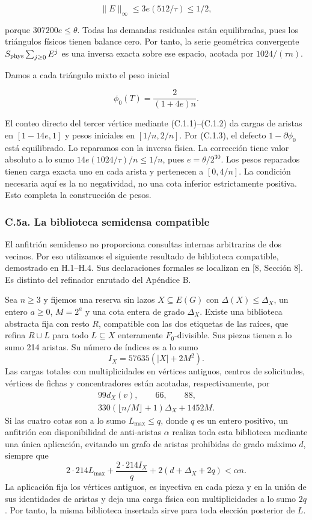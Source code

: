 \documentclass[spanish,11pt,a4paper]{article}
\begin{document}
\[\|E\|_\infty\le3e(512/\tau)\le1/2,
\tag{C.5.5}\]

porque \(307200e\le\theta\). Todas las demandas residuales están equilibradas, pues los triángulos físicos tienen balance cero. Por tanto, la serie geométrica convergente \(S_{\rm phys}\sum_{j\ge0}E^j\) es una inversa exacta sobre ese espacio, acotada por \(1024/(\tau n)\).

Damos a cada triángulo mixto el peso inicial

\[\phi_0(T)=\frac2{(1+4e)n}.
\tag{C.5.6}\]

El conteo directo del tercer vértice mediante (C.1.1)--(C.1.2) da cargas de aristas en \([1-14e,1]\) y pesos iniciales en \([1/n,2/n]\). Por (C.1.3), el defecto \(1-\partial\phi_0\) está equilibrado. Lo reparamos con la inversa física. La corrección tiene valor absoluto a lo sumo \(14e(1024/\tau)/n\le1/n\), pues \(e=\theta/2^{30}\). Los pesos reparados tienen carga exacta uno en cada arista y pertenecen a \([0,4/n]\). La condición necesaria aquí es la no negatividad, no una cota inferior estrictamente positiva. Esto completa la construcción de pesos.

\subsubsection{C.5a. La biblioteca semidensa compatible}\label{c.5a.-la-biblioteca-semidensa-compatible}

El anfitrión semidenso no proporciona consultas internas arbitrarias de dos vecinos. Por eso utilizamos el siguiente resultado de biblioteca compatible, demostrado en H.1--H.4. Sus declaraciones formales se localizan en {[}8, Sección 8{]}. Es distinto del refinador enrutado del Apéndice B.

Sea \(n\ge3\) y fijemos una reserva sin lazos \(X\subseteq E(G)\) con \(\Delta(X)\le\Delta_X\), un entero \(a\ge0\), \(M=2^a\) y una cota entera de grado \(\Delta_X\). Existe una biblioteca abstracta fija con resto \(R\), compatible con las dos etiquetas de las raíces, que refina \(R\cup L\) para todo \(L\subseteq X\) enteramente \(F_0\)-divisible. Sus piezas tienen a lo sumo 214 aristas. Su número de índices es a lo sumo \[I_X=57635(|X|+2M^2).\] Las cargas totales con multiplicidades en vértices antiguos, centros de solicitudes, vértices de fichas y concentradores están acotadas, respectivamente, por \[\begin{gathered}
99d_X(v),\qquad66,\qquad88,\\
330(\lfloor n/M\rfloor+1)\Delta_X+1452M.
\end{gathered}\] Si las cuatro cotas son a lo sumo \(L_{\max}\le q\), donde \(q\) es un entero positivo, un anfitrión con disponibilidad de anti-aristas \(\alpha\) realiza toda esta biblioteca mediante una única aplicación, evitando un grafo de aristas prohibidas de grado máximo \(d\), siempre que \[2\cdot214L_{\max}+\frac{2\cdot214 I_X}{q}
+2(d+\Delta_X+2q)<\alpha n.\] La aplicación fija los vértices antiguos, es inyectiva en cada pieza y en la unión de sus identidades de aristas y deja una carga física con multiplicidades a lo sumo \(2q\). Por tanto, la misma biblioteca insertada sirve para toda elección posterior de \(L\).
\end{document}
